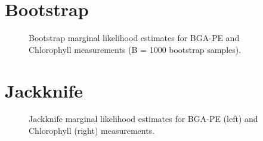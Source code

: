 \documentclass{article}
\newlength\figureheight
\newlength\figurewidth
\begin{document}
\section{Bootstrap}
\setlength\figureheight{2in}
\setlength{}
\begin{figure}[h]
\centering

\caption{Bootstrap marginal likelihood estimates for BGA-PE and Chlorophyll measurements (B = 1000 bootstrap samples).}
\end{figure}

\section{Jackknife}
\setlength\figureheight{2.7in}
\setlength{}
\begin{figure}[!h]
\centering

\hfill

\caption{Jackknife marginal likelihood estimates for BGA-PE (left) and Chlorophyll (right) measurements.}
\end{figure}
\end{document}
